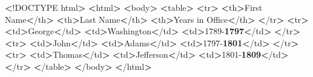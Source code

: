 \documentclass[]{book}
\newenvironment{Shaded}{\begin{snugshade}}{\end{snugshade}}
\newcommand{\ExtensionTok}[1]{#1}
\newcommand{\FunctionTok}[1]{\textcolor[rgb]{0.00,0.00,0.00}{#1}}
\newcommand{\NormalTok}[1]{#1}
\newcommand{\OperatorTok}[1]{\textcolor[rgb]{0.81,0.36,0.00}{\textbf{#1}}}
\begin{document}
\begin{Shaded}
\begin{Highlighting}[]
\OperatorTok{<}\NormalTok{!}\ExtensionTok{DOCTYPE}\NormalTok{ html}\OperatorTok{>}         
\OperatorTok{<}\ExtensionTok{html}\OperatorTok{>}                  
    \OperatorTok{<}\ExtensionTok{body}\OperatorTok{>}              
        \OperatorTok{<}\ExtensionTok{table}\OperatorTok{>}                         
            \OperatorTok{<}\FunctionTok{tr}\OperatorTok{>}                        
                \OperatorTok{<}\ExtensionTok{th}\OperatorTok{>}\NormalTok{First Name}\OperatorTok{<}\NormalTok{/th}\OperatorTok{>}     
                \OperatorTok{<}\ExtensionTok{th}\OperatorTok{>}\NormalTok{Last Name}\OperatorTok{<}\NormalTok{/th}\OperatorTok{>}      
                \OperatorTok{<}\ExtensionTok{th}\OperatorTok{>}\NormalTok{Years in Office}\OperatorTok{<}\NormalTok{/th}\OperatorTok{>}
            \OperatorTok{<}\NormalTok{/}\ExtensionTok{tr}\OperatorTok{>}                       
            \OperatorTok{<}\FunctionTok{tr}\OperatorTok{>}                        
                \OperatorTok{<}\ExtensionTok{td}\OperatorTok{>}\NormalTok{George}\OperatorTok{<}\NormalTok{/td}\OperatorTok{>}         
                \OperatorTok{<}\ExtensionTok{td}\OperatorTok{>}\NormalTok{Washington}\OperatorTok{<}\NormalTok{/td}\OperatorTok{>}     
                \OperatorTok{<}\ExtensionTok{td}\OperatorTok{>}\NormalTok{1789-}\OperatorTok{1797<}\NormalTok{/td}\OperatorTok{>}      
            \OperatorTok{<}\NormalTok{/}\ExtensionTok{tr}\OperatorTok{>}                       
            \OperatorTok{<}\FunctionTok{tr}\OperatorTok{>}                        
                \OperatorTok{<}\ExtensionTok{td}\OperatorTok{>}\NormalTok{John}\OperatorTok{<}\NormalTok{/td}\OperatorTok{>}           
                \OperatorTok{<}\ExtensionTok{td}\OperatorTok{>}\NormalTok{Adams}\OperatorTok{<}\NormalTok{/td}\OperatorTok{>}          
                \OperatorTok{<}\ExtensionTok{td}\OperatorTok{>}\NormalTok{1797-}\OperatorTok{1801<}\NormalTok{/td}\OperatorTok{>}      
            \OperatorTok{<}\NormalTok{/}\ExtensionTok{tr}\OperatorTok{>}                       
            \OperatorTok{<}\FunctionTok{tr}\OperatorTok{>}                        
                \OperatorTok{<}\ExtensionTok{td}\OperatorTok{>}\NormalTok{Thomas}\OperatorTok{<}\NormalTok{/td}\OperatorTok{>}         
                \OperatorTok{<}\ExtensionTok{td}\OperatorTok{>}\NormalTok{Jefferson}\OperatorTok{<}\NormalTok{/td}\OperatorTok{>}      
                \OperatorTok{<}\ExtensionTok{td}\OperatorTok{>}\NormalTok{1801-}\OperatorTok{1809<}\NormalTok{/td}\OperatorTok{>}      
            \OperatorTok{<}\NormalTok{/}\ExtensionTok{tr}\OperatorTok{>}                       
        \OperatorTok{<}\NormalTok{/}\ExtensionTok{table}\OperatorTok{>}                        
    \OperatorTok{<}\NormalTok{/}\ExtensionTok{body}\OperatorTok{>}             
\OperatorTok{<}\NormalTok{/}\ExtensionTok{html}\OperatorTok{>}                 
\end{Highlighting}
\end{Shaded}
\end{document}
